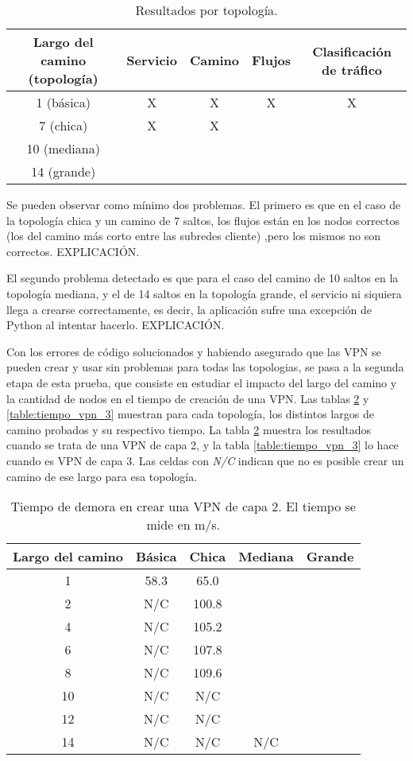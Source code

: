 \begin{table}[ht]
\caption{Resultados por topología.}
\centering 
\begin{tabular}{c c c c c}
\hline\hline
Largo del camino (topología) & Servicio & Camino & Flujos  & Clasificación de tráfico \\ [0.5ex]
\hline
1 (básica) & X & X & X & X \\
7 (chica) & X & X &  &  \\
10 (mediana) &  &  &  &  \\
14 (grande) &  &  &  &  \\ [1ex]
\hline
\end{tabular}
\label{table:problemas_por_topologia}
\end{table}
Se pueden observar como mínimo dos problemas. El primero es que en el caso de la topología chica y un camino de 7 saltos, los flujos están en los nodos correctos (los del camino más corto entre las subredes cliente) ,pero los mismos no son correctos. EXPLICACIÓN.

El segundo problema detectado es que para el caso del camino de 10 saltos en la topología mediana, y el de 14 saltos en la topología grande, el servicio ni siquiera llega a crearse correctamente, es decir, la aplicación sufre una excepción de Python al intentar hacerlo. EXPLICACIÓN.

Con los errores de código solucionados y habiendo asegurado que las VPN se pueden crear y usar sin problemas para todas las topologias, se pasa a la segunda etapa de esta prueba, que consiste en estudiar el impacto del largo del camino y la cantidad de nodos en el tiempo de creación de una VPN. Las tablas \ref{table:tiempo_vpn_2} y \ref{table:tiempo_vpn_3} muestran para cada topología, los distintos largos de camino probados y su respectivo tiempo. La tabla \ref{table:tiempo_vpn_2} muestra los resultados cuando se trata de una VPN de capa 2, y la tabla \ref{table:tiempo_vpn_3} lo hace cuando es VPN de capa 3. Las celdas con \textit{N/C} indican que no es posible crear un camino de ese largo para esa topología.

\begin{table}[ht]
	\caption{Tiempo de demora en crear una VPN de capa 2. El tiempo se mide en m/s.}
	\centering 
	\begin{tabular}{c c c c c}
		\hline\hline
		Largo del camino & Básica & Chica & Mediana  & Grande \\ [0.5ex]
		\hline
		1 & 58.3 & 65.0 &  &  \\
		2 & N/C & 100.8 &  &  \\
		4 & N/C & 105.2 &  &  \\
		6 & N/C & 107.8 &  &  \\
		8 & N/C & 109.6 &  &  \\
		10 & N/C & N/C &  &  \\
		12 & N/C & N/C &  &  \\
		14 & N/C & N/C & N/C &  \\ [1ex]
		\hline
	\end{tabular}
	\label{table:tiempo_vpn_2}
\end{table}

